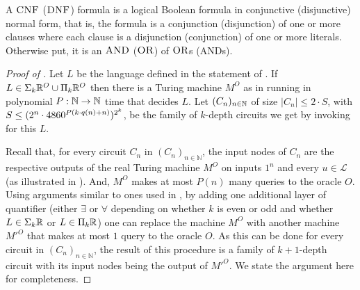 \documentclass{article}
\begin{document}
\begin{definition}
\label{def:CNFnDNFformulas}
A $\textsc{CNF}$ ($\textsc{DNF}$) formula is a logical Boolean formula in conjunctive (disjunctive) normal form, that is, the formula is a conjunction (disjunction) of one or more clauses where each clause is a disjunction (conjunction) of one or more literals. Otherwise put, it is an $\textsc{AND}$ ($\textsc{OR}$) of $\textsc{OR}$s (\textsc{AND}s).
\end{definition}



\begin{proof}[Proof of ]
Let $L$ be the language defined in the statement of . 
If $L \in \Sigma_{k}\mathbb{R}^O \cup \Pi_{k}\mathbb{R}^O$ then there is a Turing machine $M^O$ as in  running in polynomial $P :\mathbb{N} \rightarrow \mathbb{N}$ time that decides $L$. 
Let $(C_n)_{n \in \mathbb{N}}$ of size $|C_n| \leq 2 \cdot S$, with $S\leq (2^n \cdot 4860^{P(k \cdot q(n)+n)})^{2^k}$, be the family of $k$-depth circuits we get by invoking  for this $L$. 

Recall that, for every circuit $C_n$ in $(C_n)_{n \in \mathbb{N}}$, the input nodes of $C_n$ are the respective outputs of the real Turing machine $M^O$ on inputs $1^n$ and every $u \in \mathcal{L}$ (as illustrated in ). And, $M^{O}$ makes at most $P(n)$ many queries to the oracle $O$. Using arguments similar to ones used in \cite{FSS84, Cai86}, by adding one additional layer of quantifier (either $\exists$ or $\forall$ depending on whether $k$ is even or odd and whether $L \in \Sigma_{k}\mathbb{R}$ or $L \in \Pi_{k}\mathbb{R}$) one can replace the machine $M^{O}$ with another machine $M'^{O}$ that makes at most $1$ query to the oracle $O$. As this can be done for every circuit in $(C_n)_{n \in \mathbb{N}}$, the result of this procedure is a family of $k+1$-depth circuit with its input nodes being the output of $M'^{O}$. We state the argument here for completeness.


\end{proof}
\end{document}

